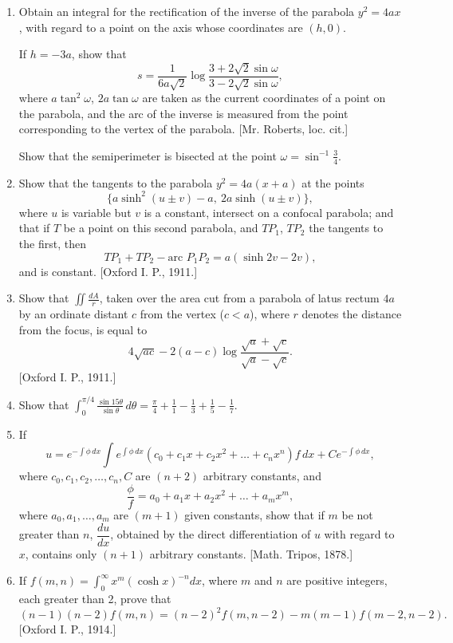 \documentclass[11pt, a4paper]{article}
\newcommand{\source}[1]{\hfill\textnormal{[#1]}}
\begin{document}
\begin{enumerate}[leftmargin=2em]
\item Obtain an integral for the rectification of the inverse of the parabola $y^2=4ax$, with regard to a point on the axis whose coordinates are $(h,0)$.

If $h=-3a$, show that
\[
s=\frac{1}{6a\sqrt2}\log\frac{3+2\sqrt2\sin\omega}{3-2\sqrt2\sin\omega},
\]
where $a\tan^2\omega$, $2a\tan\omega$ are taken as the current coordinates of a point on the parabola, and the arc of the inverse is measured from the point corresponding to the vertex of the parabola. \source{Mr. Roberts, loc. cit.}

Show that the semiperimeter is bisected at the point $\omega=\sin^{-1}\tfrac34$.

\item Show that the tangents to the parabola $y^2=4a(x+a)$ at the points
\[
\{a\sinh^2(u\pm v)-a,\ 2a\sinh(u\pm v)\},
\]
where $u$ is variable but $v$ is a constant, intersect on a confocal parabola; and that if $T$ be a point on this second parabola, and $TP_1$, $TP_2$ the tangents to the first, then
\[
TP_1+TP_2-\text{arc }P_1P_2=a(\sinh2v-2v),
\]
and is constant. \source{Oxford I. P., 1911.}

\item Show that $\displaystyle\iint\frac{dA}{r}$, taken over the area cut from a parabola of latus rectum $4a$ by an ordinate distant $c$ from the vertex ($c<a$), where $r$ denotes the distance from the focus, is equal to
\[
4\sqrt{ac}-2(a-c)\log\frac{\sqrt a+\sqrt c}{\sqrt a-\sqrt c}.
\]
\source{Oxford I. P., 1911.}

\item Show that $\displaystyle\int_0^{\pi/4}\frac{\sin15\theta}{\sin\theta}\,d\theta=\frac{\pi}{4}+\frac11-\frac13+\frac15-\frac17$.

\item If
\[
u=e^{-\int\phi\,dx}\int e^{\int\phi\,dx}(c_0+c_1x+c_2x^2+\dots+c_nx^n)f\,dx+Ce^{-\int\phi\,dx},
\]
where $c_0, c_1, c_2,\dots, c_n, C$ are $(n+2)$ arbitrary constants, and
\[
\frac{\phi}{f}=a_0+a_1x+a_2x^2+\dots+a_mx^m,
\]
where $a_0, a_1,\dots, a_m$ are $(m+1)$ given constants, show that if $m$ be not greater than $n$, $\dfrac{du}{dx}$, obtained by the direct differentiation of $u$ with regard to $x$, contains only $(n+1)$ arbitrary constants. \source{Math. Tripos, 1878.}

\item If $f(m,n)=\displaystyle\int_0^\infty x^m(\cosh x)^{-n}dx$, where $m$ and $n$ are positive integers, each greater than 2, prove that
\[
(n-1)(n-2)f(m,n)=(n-2)^2f(m,n-2)-m(m-1)f(m-2,n-2).
\]
\source{Oxford I. P., 1914.}


\end{enumerate}
\end{document}
